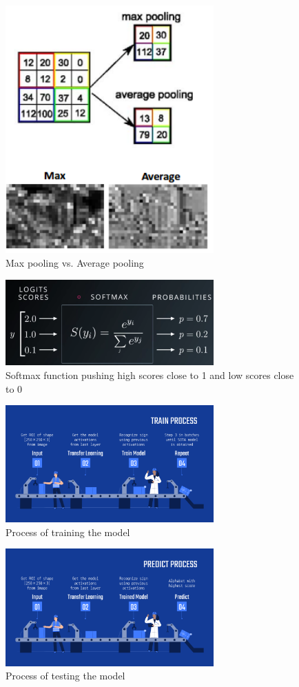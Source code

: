 \documentclass[twocolumn]{article}
\begin{document}
\begin{figure}[h]
\centering
\includegraphics[width=8cm]{./figures/max pooling vs. average pooling}
\caption{Max pooling vs. Average pooling}
\end{figure}

\begin{figure}[h]
\centering
\includegraphics[width=8cm]{./figures/softmax function}
\caption{Softmax function pushing high scores close to 1 and low scores close to 0}
\end{figure}

\begin{figure}[h]
\centering
\includegraphics[width=8cm]{./figures/train process}
\caption{Process of training the model}
\end{figure}

\begin{figure}[h]
\centering
\includegraphics[width=8cm]{./figures/predict process}
\caption{Process of testing the model}
\end{figure}
\end{document}

